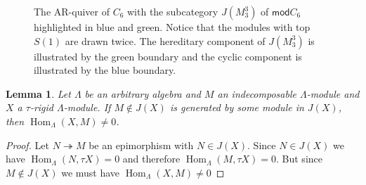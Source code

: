 \documentclass[11pt]{amsart}
\newcommand{\mods}{\mathsf{mod}}
\DeclareMathOperator{\Hom}{\mathrm{Hom}}
\newtheorem{lemma}[theorem]{Lemma}
\theoremstyle{definition}
\begin{document}
\begin{figure}
    \centering

    
    \caption{The AR-quiver of $C_6$ with the subcategory $J(M^3_3)$ of $\mods C_6$ highlighted in blue and green. Notice that the modules with top $S(1)$ are drawn twice. The hereditary component of $J(M^3_3)$ is illustrated by the green boundary and the cyclic component is illustrated by the blue boundary.}
    \label{fig:tau_perpendicular_in_cn}
\end{figure}

    
\begin{lemma}\label{lem:m_notinjasso_but_generated_by_jasso_characterization}
    Let $\Lambda$ be an arbitrary algebra and $M$ an indecomposable $\Lambda$-module and $X$ a $\tau$-rigid $\Lambda$-module. If $M \notin J(X)$ is generated by some module in $J(X)$, then $\Hom_{\Lambda}(X,M) \neq 0$.
\end{lemma}

\begin{proof}
    Let $N \twoheadrightarrow M$ be an epimorphism with $N \in J(X)$. Since $N \in J(X)$ we have $\Hom_{\Lambda}(N,\tau X) = 0$ and therefore $\Hom_{\Lambda}(M,\tau X) = 0$. But since $M \notin J(X)$ we must have $\Hom_{\Lambda}(X,M) \neq 0$
\end{proof}
\end{document}
